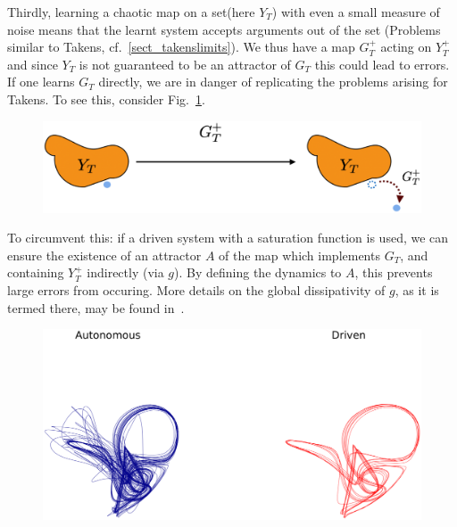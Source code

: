 \documentclass[a4paper,12pt,twoside]{report}
\begin{document}

Thirdly, learning a chaotic map on a set(here $Y_T$) with even a small measure of noise  means that the learnt system accepts arguments out of the set (Problems similar to Takens, cf.~\ref{sect_takenslimits}). 
We thus have a map $G_T^+$ acting on $Y_T^+$ and since $Y_T$ is not guaranteed to be an attractor of $G_T$ this could lead to errors.
If one learns $G_T$ directly, we are in danger of replicating the problems arising for Takens.  To see this, consider Fig.~\ref{fig:YtGtFailure}.

\begin{figure}[ht]
  \includegraphics[scale=0.25]{_YTerrors.eps}
  \centering
  \label{fig:YtGtFailure}
\end{figure}

To circumvent this: if a driven system with a saturation function is used, we can ensure the existence of an attractor $A$ of the map which implements $G_T$, and containing $Y_T^+$ indirectly (via $g$).  
By defining the dynamics to $A$, this prevents large errors from occuring.  
More details on the global dissipativity of $g$, as it is termed there, may be found in~\cite{Supp}.

\begin{figure}[ht]
  \includegraphics[scale=0.25]{_autovsdriven.eps}
  \centering
  \label{fig:learningFailure}
\end{figure}
\end{document}
